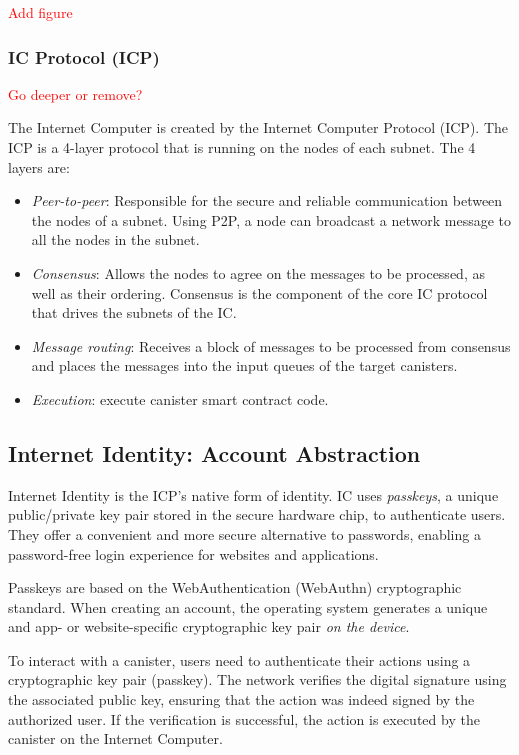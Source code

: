 \textcolor{red}{Add figure}

\subsubsection{IC Protocol (ICP)}

\textcolor{red}{Go deeper or remove?}

The Internet Computer is created by the Internet Computer Protocol (ICP). The ICP is a 4-layer protocol that is running on the nodes of each subnet. The 4 layers are: \cite{icp-how-it-works}

\begin{itemize}
    \item \textit{Peer-to-peer}: Responsible for the secure and reliable communication between the nodes of a subnet. Using P2P, a node can broadcast a network message to all the nodes in the subnet.
    \item \textit{Consensus}: Allows the nodes to agree on the messages to be processed, as well as their ordering. Consensus is the component of the core IC protocol that drives the subnets of the IC.
    \item \textit{Message routing}: Receives a block of messages to be processed from consensus and places the messages into the input queues of the target canisters.
    \item \textit{Execution}: execute canister smart contract code.
\end{itemize}


\subsection{Internet Identity: Account Abstraction}

Internet Identity is the ICP's native form of identity. IC uses \textit{passkeys}, a unique public/private key pair stored in the secure hardware chip, to authenticate users. They offer a convenient and more secure alternative to passwords, enabling a password-free login experience for websites and applications. \cite{icp-identity}

Passkeys are based on the WebAuthentication (WebAuthn) cryptographic standard. When creating an account, the operating system generates a unique and app- or website-specific cryptographic key pair \textit{on the device}. \cite{icp-passkey}

To interact with a canister, users need to authenticate their actions using a cryptographic key pair (passkey). The network verifies the digital signature using the associated public key, ensuring that the action was indeed signed by the authorized user. If the verification is successful, the action is executed by the canister on the Internet Computer. \cite{icp-passkey}

